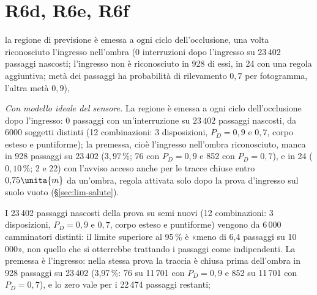 \section*{R6d, R6e, R6f}
la regione di previsione è emessa a ogni ciclo dell'occlusione, una volta riconosciuto l'ingresso nell'ombra (0 interruzioni dopo l'ingresso su $23\,402$ passaggi nascosti; l'ingresso non è riconosciuto in 928 di essi, in 24 con una regola aggiuntiva; metà dei passaggi ha probabilità di rilevamento $0{,}7$ per fotogramma, l'altra metà $0{,}9$),

\emph{Con modello ideale del sensore.} La regione è emessa a ogni ciclo dell'occlusione dopo l'ingresso: 0 passaggi con un'interruzione su $23\,402$ passaggi nascosti, da 6000 soggetti distinti (12 combinazioni: 3 disposizioni, $P_D=0{,}9$ e $0{,}7$, corpo esteso e puntiforme); la premessa, cioè l'ingresso nell'ombra riconosciuto, manca in 928 passaggi su $23\,402$ ($3{,}97\,\%$; 76 con $P_D=0{,}9$ e 852 con $P_D=0{,}7$), e in 24 ($0{,}10\,\%$; 2 e 22) con l'avviso acceso anche per le tracce chiuse entro $0{,}75\unita{m}$ da un'ombra, regola attivata solo dopo la prova d'ingresso sul suolo vuoto (\S\ref{sec:lim-salute}).

I 23\,402 passaggi nascosti della prova su semi nuovi (12 combinazioni: 3 disposizioni, $P_D=0{,}9$ e $0{,}7$, corpo esteso e puntiforme) vengono da 6\,000 camminatori distinti: il limite superiore al 95\,\% è «meno di 6,4 passaggi su 10\,000», non quello che si otterrebbe trattando i passaggi come indipendenti. La premessa è l'ingresso: nella stessa prova la traccia è chiusa prima dell'ombra in 928 passaggi su 23\,402 (3,97\,\%: 76 su 11\,701 con $P_D=0{,}9$ e 852 su 11\,701 con $P_D=0{,}7$), e lo zero vale per i 22\,474 passaggi restanti;

